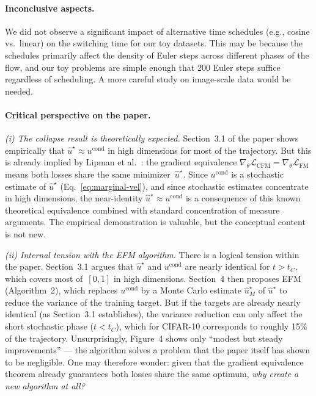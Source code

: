 \documentclass[10pt,a4paper]{article}
\theoremstyle{definition}
\newcommand{\cL}{\mathcal{L}}
\begin{document}
\paragraph{Inconclusive aspects.}
We did not observe a significant impact of alternative time schedules (e.g., cosine vs.\ linear) on the switching time for our toy datasets.
This may be because the schedules primarily affect the density of Euler steps across different phases of the flow, and our toy problems are simple enough that 200 Euler steps suffice regardless of scheduling.
A more careful study on image-scale data would be needed.

\paragraph{Critical perspective on the paper.}

\emph{(i) The collapse result is theoretically expected.}
Section~3.1 of the paper shows empirically that $\hat{u}^\star \approx u^{\mathrm{cond}}$ in high dimensions for most of the trajectory.
But this is already implied by Lipman et al.~\cite[Thm.~2]{lipman2023flow}: the gradient equivalence $\nabla_\theta \cL_{\mathrm{CFM}} = \nabla_\theta \cL_{\mathrm{FM}}$ means both losses share the same minimizer~$\hat{u}^\star$.
Since $u^{\mathrm{cond}}$ is a stochastic estimate of $\hat{u}^\star$ (Eq.~\ref{eq:marginal-vel}), and since stochastic estimates concentrate in high dimensions, the near-identity $\hat{u}^\star \approx u^{\mathrm{cond}}$ is a consequence of this known theoretical equivalence combined with standard concentration of measure arguments.
The empirical demonstration is valuable, but the conceptual content is not new.

\emph{(ii) Internal tension with the EFM algorithm.}
There is a logical tension within the paper.
Section~3.1 argues that $\hat{u}^\star$ and $u^{\mathrm{cond}}$ are nearly identical for $t > t_C$, which covers most of~$[0,1]$ in high dimensions.
Section~4 then proposes EFM (Algorithm~2), which replaces $u^{\mathrm{cond}}$ by a Monte Carlo estimate $\hat{u}^\star_M$ of $\hat{u}^\star$ to reduce the variance of the training target.
But if the targets are already nearly identical (as Section~3.1 establishes), the variance reduction can only affect the short stochastic phase ($t < t_C$), which for CIFAR-10 corresponds to roughly 15\% of the trajectory.
Unsurprisingly, Figure~4 shows only ``modest but steady improvements'' --- the algorithm solves a problem that the paper itself has shown to be negligible.
One may therefore wonder: given that the gradient equivalence theorem already guarantees both losses share the same optimum, \emph{why create a new algorithm at all?}
\end{document}
